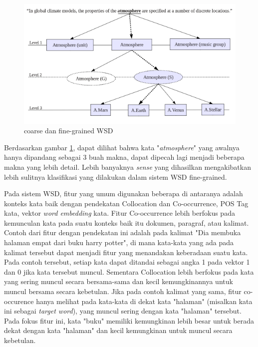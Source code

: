 \begin{figure}
	\centering
	\includegraphics[width=1\linewidth]{adit_pics/coarse-fine}
	\caption{coarse dan fine-grained WSD  \citep{shen2013coarse}}
	\label{fig:coarse}
\end{figure}

Berdasarkan gambar \ref{fig:coarse}, dapat dilihat bahwa kata "\textit{atmosphere}" yang awalnya hanya dipandang sebagai 3 buah makna, dapat dipecah lagi menjadi beberapa makna yang lebih detail. Lebih banyaknya \textit{sense} yang dihasilkan mengakibatkan lebih sulitnya klasifikasi yang dilakukan dalam sistem WSD fine-grained.

Pada sistem WSD, fitur yang umum digunakan beberapa di antaranya adalah konteks kata baik dengan pendekatan Collocation dan Co-occurrence, POS Tag kata, vektor \textit{word embedding} kata. Fitur Co-occurrence lebih berfokus pada kemunculan kata pada suatu konteks baik itu dokumen, paragraf, atau kalimat. Contoh dari fitur dengan pendekatan ini adalah pada kalimat "Dia membuka halaman empat dari buku harry potter", di mana kata-kata yang ada pada kalimat tersebut dapat menjadi fitur yang menandakan keberadaan suatu kata. Pada contoh tersebut, setiap kata dapat ditandai sebagai angka 1 pada vektor 1 dan 0 jika kata tersebut muncul. Sementara Collocation lebih berfokus pada kata yang sering muncul secara bersama-sama dan kecil kemungkinannya untuk muncul bersama secara kebetulan. Jika pada contoh kalimat yang sama, fitur co-occurence hanya melihat pada kata-kata di dekat kata "halaman" (misalkan kata ini sebagai \textit{target word}), yang muncul sering dengan kata "halaman" tersebut. Pada fokus fitur ini, kata "buku" memiliki kemungkinan lebih besar untuk berada dekat dengan kata "halaman" dan kecil kemungkinan untuk muncul secara kebetulan.

